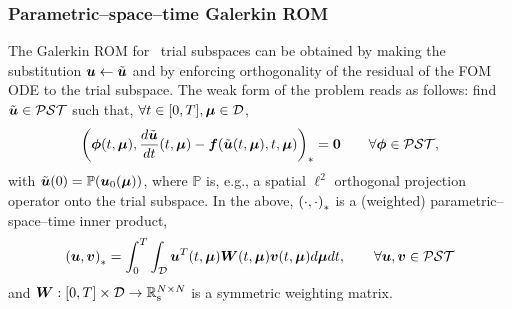 \documentclass[3p,computermodern,10pt]{elsarticle}
\begin{document}

\subsubsection{Parametric--space--time Galerkin ROM}
The Galerkin ROM for \parametricSpaceTimeAcronym\ trial subspaces can be obtained by making the substitution $\boldsymbol u \leftarrow \tilde{\boldsymbol u}$ and by enforcing orthogonality of the residual of the FOM ODE to the trial subspace. The weak form of the problem reads as follows: find $\tilde{\boldsymbol u} \in \mathcal{PST}$ such that, $\forall t \in [0,T], \boldsymbol \mu \in \mathcal{D}$,
\begin{equation}\label{eq:pst_galerkin}
\left(  \boldsymbol \phi(t,\boldsymbol \mu) ,  \frac{d \tilde{\boldsymbol u}}{dt}(t,\boldsymbol \mu) - \boldsymbol f(\tilde{\boldsymbol u}(t,\boldsymbol \mu),t,\boldsymbol \mu)  \right)_{*} = \boldsymbol 0 \qquad \forall \boldsymbol \phi \in  \mathcal{PST} ,
\end{equation}
with $\tilde{\boldsymbol u}(0) = \mathbb{P}(\boldsymbol u_0(\boldsymbol \mu))$, where $\mathbb{P}$ is, e.g., a spatial $\ell^2$ orthogonal projection operator onto the trial subspace. In the above, $\left( \cdot, \cdot \right)_{*}$ is a (weighted) parametric--space--time inner product, 
$$\left( \boldsymbol u,  \boldsymbol v \right)_{*} = \int_0^T \int _{\mathcal{D}} \boldsymbol u^T(t,\boldsymbol \mu) \boldsymbol W (t,\boldsymbol \mu)\boldsymbol v(t,\boldsymbol \mu)  d \boldsymbol \mu dt, \qquad \forall \boldsymbol u, \boldsymbol v \in \mathcal{PST}$$ 
and $\boldsymbol W : [0,T] \times \mathcal{D} \rightarrow \mathbb{R}_{\text{s}}^{N\times N}$ is a symmetric weighting matrix.
\end{document}
